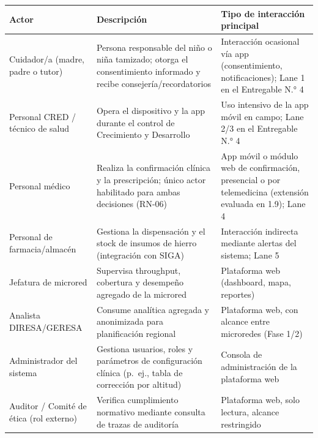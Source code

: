 \documentclass[11pt,a4paper]{article}
\begin{document}
{\small
\begin{longtable}[]{@{}
  >{\raggedright\arraybackslash}p{}
  >{\raggedright\arraybackslash}p{}
  >{\raggedright\arraybackslash}p{}@{}}
\toprule\noalign{}
\begin{minipage}[b]{\linewidth}\raggedright
Actor
\end{minipage} & \begin{minipage}[b]{\linewidth}\raggedright
Descripción
\end{minipage} & \begin{minipage}[b]{\linewidth}\raggedright
Tipo de interacción principal
\end{minipage} \\
\midrule\noalign{}
\endhead
\bottomrule\noalign{}
\endlastfoot
Cuidador/a (madre, padre o tutor) & Persona responsable del niño o niña tamizado; otorga el consentimiento informado y recibe consejería/recordatorios & Interacción ocasional vía app (consentimiento, notificaciones); Lane 1 en el Entregable N.° 4 \\
Personal CRED / técnico de salud & Opera el dispositivo y la app durante el control de Crecimiento y Desarrollo & Uso intensivo de la app móvil en campo; Lane 2/3 en el Entregable N.° 4 \\
Personal médico & Realiza la confirmación clínica y la prescripción; único actor habilitado para ambas decisiones (RN-06) & App móvil o módulo web de confirmación, presencial o por telemedicina (extensión evaluada en 1.9); Lane 4 \\
Personal de farmacia/almacén & Gestiona la dispensación y el stock de insumos de hierro (integración con SIGA) & Interacción indirecta mediante alertas del sistema; Lane 5 \\
Jefatura de microred & Supervisa throughput, cobertura y desempeño agregado de la microred & Plataforma web (dashboard, mapa, reportes) \\
Analista DIRESA/GERESA & Consume analítica agregada y anonimizada para planificación regional & Plataforma web, con alcance entre microredes (Fase 1/2) \\
Administrador del sistema & Gestiona usuarios, roles y parámetros de configuración clínica (p.~ej., tabla de corrección por altitud) & Consola de administración de la plataforma web \\
Auditor / Comité de ética (rol externo) & Verifica cumplimiento normativo mediante consulta de trazas de auditoría & Plataforma web, solo lectura, alcance restringido \\

\end{longtable}}
\end{document}
